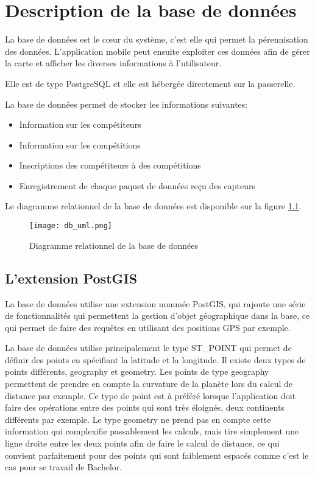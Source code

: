 \chapter{Description de la base de données}\label{ch:bd}

La base de données est le cœur du système, c'est elle qui permet la pérennisation des données. L'application mobile peut ensuite exploiter ces données afin de gérer la carte et afficher les diverses informations à l'utilisateur.

Elle est de type PostgreSQL et elle est hébergée directement sur la passerelle.

La base de données permet de stocker les informations suivantes:

\begin{itemize}
\item Information sur les compétiteurs
\item Information sur les compétitions
\item Inscriptions des compétiteurs à des compétitions
\item Enregistrement de chaque paquet de données reçu des capteurs
\end{itemize}

Le diagramme relationnel de la base de données est disponible sur la figure \ref{fig:db_uml}.

\begin{figure}[htb]
\centering 
\texttt{[image: db\_uml.png]} 
\caption{Diagramme relationnel de la base de données}
\label{fig:db_uml}
 \end{figure}

\section{L'extension PostGIS}


La base de données utilise une extension nommée PostGIS, qui rajoute une série de fonctionnalités qui permettent la gestion d'objet géographique dans la base, ce qui permet de faire des requêtes en utilisant des positions GPS par exemple.

La base de données utilise principalement le type ST\_POINT qui permet de définir des points en spécifiant la latitude et la longitude. Il existe deux types de points différents, geography et geometry. Les points de type geography permettent de prendre en compte la curvature de la planète lors du calcul de distance par exemple. Ce type de point est à préféré lorsque l'application doit faire des opérations entre des points qui sont très éloignés, deux continents différents par exemple. Le type geometry ne prend pas en compte cette information qui complexifie passablement les calculs, mais tire simplement une ligne droite entre les deux points afin de faire le calcul de distance, ce qui convient parfaitement pour des points qui sont faiblement espacés comme c'est le cas pour se travail de Bachelor.

